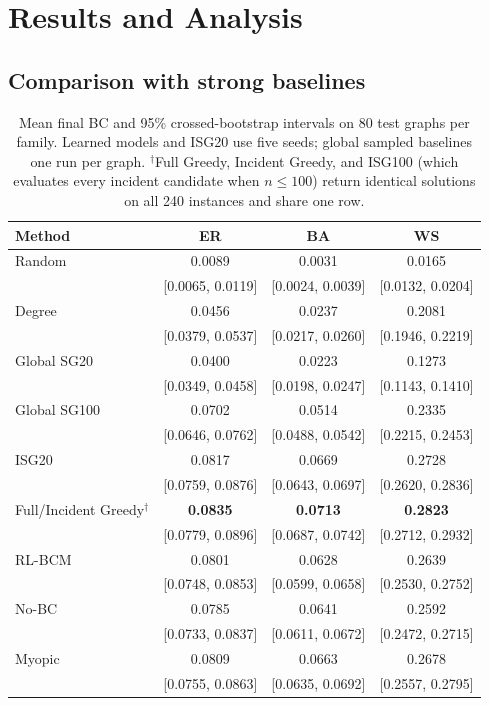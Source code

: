 \documentclass[runningheads]{llncs}
\newcommand{\rlbcm}{RL-BCM}
\begin{document}
\section{Results and Analysis}
\label{sec:results}
\subsection{Comparison with strong baselines}
\begin{table}[t]
\centering
\caption{Mean final BC and 95\% crossed-bootstrap intervals on 80 test
graphs per family. Learned models and ISG20 use five seeds; global sampled
baselines one run per graph. $^\dagger$Full Greedy, Incident Greedy, and
ISG100 (which evaluates every incident candidate when $n\le100$) return
identical solutions on all 240 instances and share one row.}
\label{tab:main}
\small
\setlength{\tabcolsep}{8pt}
\begin{tabular}{lccc}
\toprule
Method & ER & BA & WS \\
\midrule
Random & 0.0089 & 0.0031 & 0.0165 \\
 & {\scriptsize [0.0065, 0.0119]} & {\scriptsize [0.0024, 0.0039]} & {\scriptsize [0.0132, 0.0204]} \\[1pt]
Degree & 0.0456 & 0.0237 & 0.2081 \\
 & {\scriptsize [0.0379, 0.0537]} & {\scriptsize [0.0217, 0.0260]} & {\scriptsize [0.1946, 0.2219]} \\[1pt]
Global SG20 & 0.0400 & 0.0223 & 0.1273 \\
 & {\scriptsize [0.0349, 0.0458]} & {\scriptsize [0.0198, 0.0247]} & {\scriptsize [0.1143, 0.1410]} \\[1pt]
Global SG100 & 0.0702 & 0.0514 & 0.2335 \\
 & {\scriptsize [0.0646, 0.0762]} & {\scriptsize [0.0488, 0.0542]} & {\scriptsize [0.2215, 0.2453]} \\[1pt]
ISG20 & 0.0817 & 0.0669 & 0.2728 \\
 & {\scriptsize [0.0759, 0.0876]} & {\scriptsize [0.0643, 0.0697]} & {\scriptsize [0.2620, 0.2836]} \\[1pt]
Full/Incident Greedy$^\dagger$ & \textbf{0.0835} & \textbf{0.0713} & \textbf{0.2823} \\
 & {\scriptsize [0.0779, 0.0896]} & {\scriptsize [0.0687, 0.0742]} & {\scriptsize [0.2712, 0.2932]} \\[1pt]
\midrule
\rlbcm & 0.0801 & 0.0628 & 0.2639 \\
 & {\scriptsize [0.0748, 0.0853]} & {\scriptsize [0.0599, 0.0658]} & {\scriptsize [0.2530, 0.2752]} \\[1pt]
No-BC & 0.0785 & 0.0641 & 0.2592 \\
 & {\scriptsize [0.0733, 0.0837]} & {\scriptsize [0.0611, 0.0672]} & {\scriptsize [0.2472, 0.2715]} \\[1pt]
Myopic & 0.0809 & 0.0663 & 0.2678 \\
 & {\scriptsize [0.0755, 0.0863]} & {\scriptsize [0.0635, 0.0692]} & {\scriptsize [0.2557, 0.2795]} \\[1pt]
\bottomrule
\end{tabular}
\end{table}
\end{document}
